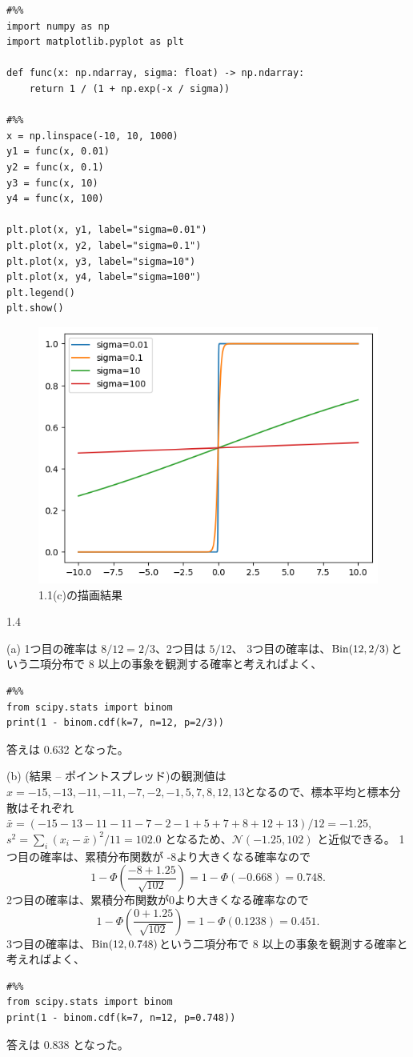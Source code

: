 \documentclass[pdflatex,ja=standard]{bxjsarticle}
\begin{document}
\begin{lstlisting}
#%%
import numpy as np
import matplotlib.pyplot as plt

def func(x: np.ndarray, sigma: float) -> np.ndarray:
    return 1 / (1 + np.exp(-x / sigma))

#%% 
x = np.linspace(-10, 10, 1000)
y1 = func(x, 0.01)
y2 = func(x, 0.1)
y3 = func(x, 10)
y4 = func(x, 100)

plt.plot(x, y1, label="sigma=0.01")
plt.plot(x, y2, label="sigma=0.1")
plt.plot(x, y3, label="sigma=10")
plt.plot(x, y4, label="sigma=100")
plt.legend()
plt.show()
\end{lstlisting}

\begin{figure}
    \centering
    \includegraphics[width=0.5\linewidth]{output_sigmoid_like.png}
    \caption{1.1(c)の描画結果}
    \label{fig:placeholder}
\end{figure}

1.4

(a) 1つ目の確率は $8/12 = 2/3$、2つ目は $5/12$、
3つ目の確率は、$\rm{Bin}(12, 2/3)$という二項分布で 8 以上の事象を観測する確率と考えればよく、
\begin{lstlisting}
#%% 
from scipy.stats import binom
print(1 - binom.cdf(k=7, n=12, p=2/3))
\end{lstlisting}
答えは 0.632 となった。

(b) (結果 -- ポイントスプレッド)の観測値は $x=-15,-13,-11,-11,-7,-2,-1,5,7,8,12,13$となるので、標本平均と標本分散はそれぞれ $\bar{x}=(-15-13-11-11-7-2-1+5+7+8+12+13)/12=-1.25$, $s^2 = \sum_i(x_i-\bar{x})^2/11=102.0$ となるため、$\mathcal{N} (-1.25, 102)$ と近似できる。
1つ目の確率は、累積分布関数が -8より大きくなる確率なので 
\begin{equation}
    1-\Phi(\frac{-8+1.25}{\sqrt{102}}) = 1- \Phi(-0.668) = 0.748.
\end{equation}
2つ目の確率は、累積分布関数が0より大きくなる確率なので
\begin{equation}
    1-\Phi(\frac{0+1.25}{\sqrt{102}}) = 1- \Phi(0.1238) = 0.451.
\end{equation}
3つ目の確率は、$\rm{Bin}(12, 0.748)$という二項分布で 8 以上の事象を観測する確率と考えればよく、
\begin{lstlisting}
#%% 
from scipy.stats import binom
print(1 - binom.cdf(k=7, n=12, p=0.748))
\end{lstlisting}
答えは 0.838 となった。
\end{document}
